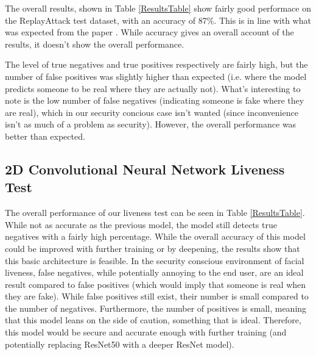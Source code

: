 \documentclass[11pt,a4paper]{article}
\begin{document}
        The overall results, shown in Table \ref{ResultsTable} show fairly good performace on the ReplayAttack test dataset, with an accuracy of 87\%. This is in line with
        what was expected from the paper \cite{ImageQualityAssessmentTest}. While accuracy gives an overall account of the results, it doesn't show the overall performance.
        
        The level of true negatives and true positives respectively are fairly high, but the number of false positives was slightly higher than expected (i.e. where the model predicts someone to be real where they are actually not).
        What's interesting to note is the low number of false negatives (indicating someone is fake where they are real), which in our security concious case isn't wanted (since inconvenience isn't as much of a problem as security).
        However, the overall performance was better than expected.

    \subsection{2D Convolutional Neural Network Liveness Test}



        The overall performance of our liveness test can be seen in Table \ref{ResultsTable}. While not as accurate as the previous model, the model still detects true negatives with a fairly high percentage.
        While the overall accuracy of this model could be improved with further training or by deepening, the results show that this basic architecture is feasible. In the security conscious environment of facial liveness,
        false negatives, while potentially annoying to the end user, are an ideal result compared to false positives (which would imply that someone is real when they are fake). While false positives still exist, their number is small compared to the number of negatives.
        Furthermore, the number of positives is small, meaning that this model leans on the side of caution, something that is ideal. Therefore, this model would be secure and accurate enough with further training (and potentially replacing ResNet50 with a deeper ResNet model).
\end{document}
